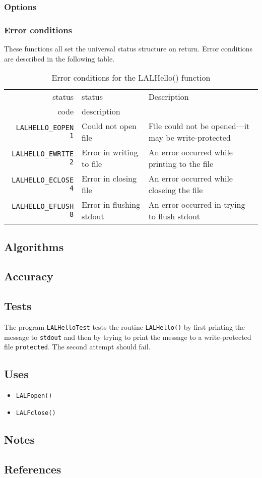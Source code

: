 \documentclass{article}
\begin{document}
\subsubsection{Options}

\subsubsection{Error conditions}

These functions all set the universal status structure on return.
Error conditions are described in the following table.

\begin{table}
\begin{tabular}{|r|l|p{2in}|}\hline
status  & status          & Description\\
code    & description     & \\\hline
\verb+LALHELLO_EOPEN  1+ & Could not open file &
File could not be opened---it may be write-protected\\
\verb+LALHELLO_EWRITE 2+ & Error in writing to file &
An error occurred while printing to the file\\
\verb+LALHELLO_ECLOSE 4+ & Error in closing file &
An error occurred while closeing the file\\
\verb+LALHELLO_EFLUSH 8+ & Error in flushing stdout &
An error occurred in trying to flush stdout\\
\hline
\end{tabular}
\caption{Error conditions for the LALHello() function}\label{tbl:CV}
\end{table}

\subsection{Algorithms}

\subsection{Accuracy}

\subsection{Tests}

The program \texttt{LALHelloTest} tests the routine \texttt{LALHello()} by
first printing the message to \texttt{stdout} and then by trying to print the
message to a write-protected file \texttt{protected}.  The second attempt
should fail.

\subsection{Uses}

\begin{itemize}
\item\texttt{LALFopen()}
\item\texttt{LALFclose()}
\end{itemize}

\subsection{Notes}

\subsection{References}
\end{document}

